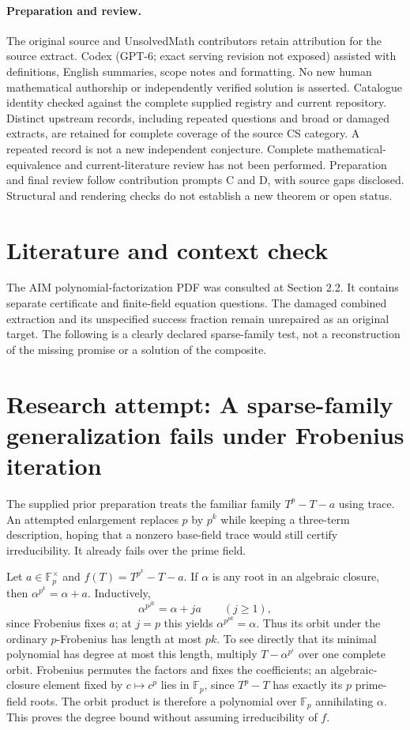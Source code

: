 \documentclass[11pt]{article}
\begin{document}
\paragraph{Preparation and review.}
The original source and UnsolvedMath contributors retain attribution for the source extract. Codex (GPT-6; exact serving revision not exposed) assisted with definitions, English summaries, scope notes and formatting. No new human mathematical authorship or independently verified solution is asserted. Catalogue identity checked against the complete supplied registry and current repository. Distinct upstream records, including repeated questions and broad or damaged extracts, are retained for complete coverage of the source CS category. A repeated record is not a new independent conjecture. Complete mathematical-equivalence and current-literature review has not been performed. Preparation and final review follow contribution prompts C and D, with source gaps disclosed. Structural and rendering checks do not establish a new theorem or open status.
\label{end:statement}

\section{Literature and context check}
The AIM polynomial-factorization PDF was consulted at Section 2.2. It
contains separate certificate and finite-field equation questions. The damaged
combined extraction and its unspecified success fraction remain unrepaired as
an original target. The following is a clearly declared sparse-family test,
not a reconstruction of the missing promise or a solution of the composite.
\section{Research attempt: A sparse-family generalization fails under Frobenius iteration}
The supplied prior preparation treats the familiar family $T^p-T-a$ using
trace. An attempted enlargement replaces $p$ by $p^k$ while keeping a three-term
description, hoping that a nonzero base-field trace would still certify
irreducibility. It already fails over the prime field.

Let $a\in\mathbb F_p^\times$ and $f(T)=T^{p^k}-T-a$. If $\alpha$ is any root
in an algebraic closure, then
$\alpha^{p^k}=\alpha+a$. Inductively,
\[
 \alpha^{p^{jk}}=\alpha+ja\qquad(j\ge1),
\]
since Frobenius fixes $a$; at $j=p$ this yields
$\alpha^{p^{pk}}=\alpha$. Thus its orbit under the ordinary $p$-Frobenius
has length at most $pk$. To see directly that its minimal polynomial has degree
at most this length, multiply $T-\alpha^{p^i}$ over one complete orbit. Frobenius
permutes the factors and fixes the coefficients; an algebraic-closure element
fixed by $c\mapsto c^p$ lies in $\mathbb F_p$, since $T^p-T$ has exactly its
$p$ prime-field roots. The orbit product is therefore a polynomial over
$\mathbb F_p$ annihilating $\alpha$. This proves the degree bound without
assuming irreducibility of $f$.
\end{document}
